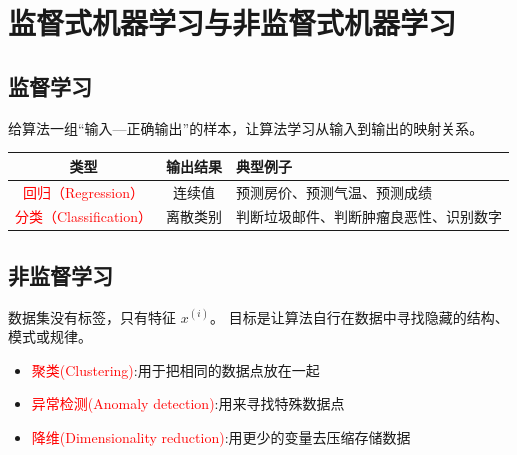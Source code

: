 \documentclass[12pt,a4paper]{ctexart}
\begin{document}
\section{监督式机器学习与非监督式机器学习}
\subsection{监督学习}
\begin{definitionbox}[监督学习的关键特征]
给算法一组“输入—正确输出”的样本，让算法学习从输入到输出的映射关系。
\end{definitionbox}


\begin{examplebox}[监督学习的分类和用途]

\begin{center}
    \begin{tabularx}{\linewidth}{|c|c|X|}
        \hline
        类型 & 输出结果 & 典型例子 \\
        \hline
        \textcolor{red}{回归（Regression）} & 连续值 & 预测房价、预测气温、预测成绩 \\
        \hline
        \textcolor{red}{分类（Classification）} & 离散类别 & 判断垃圾邮件、判断肿瘤良恶性、识别数字 \\
        \hline
    \end{tabularx}
\end{center}
\end{examplebox}

\subsection{非监督学习}
\begin{definitionbox}[非监督学习的关键特征]
数据集没有标签，只有特征 $x^{(i)}$。
目标是让算法自行在数据中寻找隐藏的结构、模式或规律。
\end{definitionbox}

\begin{examplebox}[监督学习的分类和主要特征]
\begin{itemize}
  \item \textcolor{red}{聚类(Clustering)}:用于把相同的数据点放在一起
  \item \textcolor{red}{异常检测(Anomaly detection)}:用来寻找特殊数据点
  \item \textcolor{red}{降维(Dimensionality reduction)}:用更少的变量去压缩存储数据

\end{itemize}
\end{examplebox}
\end{document}
